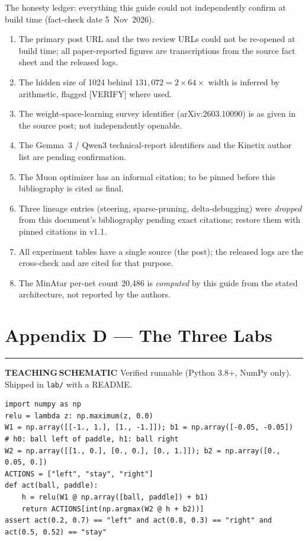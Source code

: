 \documentclass[11pt,a4paper]{article}
\newcommand{\bS}{\textcolor{wspamber}{\rule[0.12ex]{1.5mm}{1.5mm}}\;\textcolor{wspamber}{\textbf{TEACHING\,SCHEMATIC}}}
\begin{document}
The honesty ledger: everything this guide could not independently confirm at build time (fact-check date 5~Nov~2026). \begin{enumerate}[leftmargin=1.6em, itemsep=1pt]
\item The primary post URL and the two review URLs could not be re-opened at build time; all paper-reported figures are transcriptions from the source fact sheet and the released logs.
\item The hidden size of 1024 behind $131{,}072 = 2 \times 64 \times$ width is inferred by arithmetic, flagged [VERIFY] where used.
\item The weight-space-learning survey identifier (arXiv:2603.10090) is as given in the source post; not independently openable.
\item The Gemma~3 / Qwen3 technical-report identifiers and the Kinetix author list are pending confirmation.
\item The Muon optimizer has an informal citation; to be pinned before this bibliography is cited as final.
\item Three lineage entries (steering, sparse-pruning, delta-debugging) were \emph{dropped} from this document's bibliography pending exact citations; restore them with pinned citations in v1.1.
\item All experiment tables have a single source (the post); the released logs are the cross-check and are cited for that purpose.
\item The MinAtar per-net count 20{,}486 is \emph{computed} by this guide from the stated architecture, not reported by the authors.
\end{enumerate}

\section{Appendix D --- The Three Labs}\label{app:labs}

\bS\; Verified runnable (Python 3.8+, NumPy only). Shipped in \texttt{lab/} with a README.

\begin{lstlisting}[caption={lab/01\_compile\_a\_rule.py --- hand-compile a paddle follower (teaching schematic).}]
import numpy as np
relu = lambda z: np.maximum(z, 0.0)
W1 = np.array([[-1., 1.], [1., -1.]]); b1 = np.array([-0.05, -0.05])   # h0: ball left of paddle, h1: ball right
W2 = np.array([[1., 0.], [0., 0.], [0., 1.]]); b2 = np.array([0., 0.05, 0.])
ACTIONS = ["left", "stay", "right"]
def act(ball, paddle):
    h = relu(W1 @ np.array([ball, paddle]) + b1)
    return ACTIONS[int(np.argmax(W2 @ h + b2))]
assert act(0.2, 0.7) == "left" and act(0.8, 0.3) == "right" and act(0.5, 0.52) == "stay"
\end{lstlisting}
\end{document}
